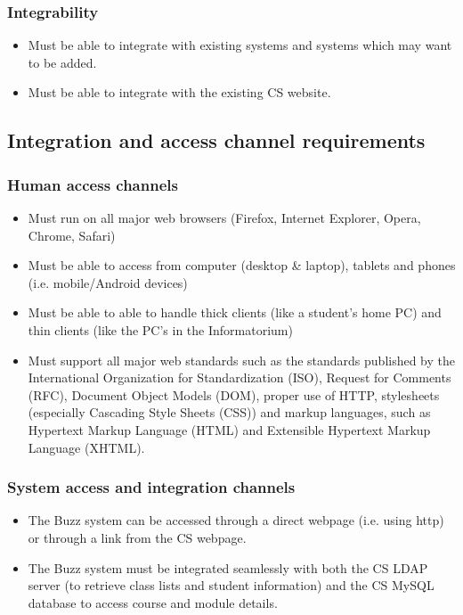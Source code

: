 \documentclass[12pt, oneside]{article}
\begin{document}
		\subsubsection{Integrability}
				\begin{itemize}
					\item Must be able to integrate with existing systems and systems which may want to be added.
					\item Must be able to integrate with the existing CS website.
				\end{itemize}
				
	\subsection{Integration and access channel requirements}
				\subsubsection{Human access channels}
				\begin{itemize}
					\item Must run on all major web browsers (Firefox, Internet Explorer, Opera, Chrome, Safari)
					\item Must be able to access from computer (desktop \& laptop), tablets and phones (i.e. mobile/Android devices)
					\item Must be able to able to handle thick clients (like a student’s home PC) and thin clients (like the PC’s in the Informatorium)
					\item Must support all major web standards such as the standards published by the International Organization for Standardization (ISO), Request for Comments (RFC), Document Object Models (DOM), proper use of HTTP, stylesheets (especially Cascading Style Sheets (CSS)) and markup languages, such as Hypertext Markup Language (HTML) and Extensible Hypertext Markup Language (XHTML).
				\end{itemize}
				\subsubsection{System access and integration channels}
				\begin{itemize}
					\item The Buzz system can be accessed through a direct webpage (i.e. using http) or through a link from the CS webpage.
					\item The Buzz system must be integrated seamlessly with both the CS LDAP server (to retrieve class lists and student information) and the CS MySQL database to access course and module details.
				\end{itemize}
\end{document}
